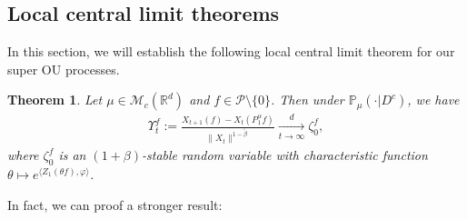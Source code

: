 \documentclass[12pt,a4paper]{amsart}
\theoremstyle{plain}
\newtheorem{thm}{Theorem}[section]
\theoremstyle{definition}
\numberwithin{equation}{section}
\begin{document}
\begin{comment}
  Step 5.
  We will show that $I_3(t) \xrightarrow[t\to \infty]{\widetilde {\mathbb P}_\mu \text{-} a.s.} 0$.
  In fact, we have
  \begin{align}
    & |I_3(t)|
      \leq \frac{\langle |P^\alpha_tf|,X_0\rangle}{(t\|X_t\|)^{\frac{1}{1+\beta}}}
      \leq \frac{\langle e^{\alpha t - \kappa_f b t}Qf,X_0\rangle}{(te^{\alpha t} H_t)^{\frac{1}{1+\beta}}} \\
    & = t^{-\frac{1}{1+\beta}} e^{\frac{\beta \alpha t}{1+\beta} - k_fbt} H_t^{-\frac{1}{1+\beta}} \langle Qf,X_0\rangle
      = t^{-\frac{1}{1+\beta}} H_t^{-\frac{1}{1+\beta}} \langle Qf,X_0\rangle
      \xrightarrow[t\to \infty]{\widetilde {\mathbb P}_\mu \text{-} a.s.} 0.
  \end{align}
  
	Finally, combining Steps 3--5, we complete the proof of Theorem \ref{thm: critical clt}.
\end{proof}
\end{comment}
\subsection{Local central limit theorems}
\label{sec:critical}
In this section, we will establish the following local central limit theorem for our super OU processes.
\begin{thm}
  \label{lem:PR:LC}
  Let $\mu \in \mathcal M_c(\mathbb R^d)$ and $f\in \mathcal{P}\setminus \{0\}$.
  Then under $\mathbb{P}_{\mu}(\cdot | D ^c)$, we have
  \begin{align}
    \label{eq:PR:LC:1}
    \Upsilon^f_t 
    := \frac{X_{t+1} (f) - X_t(P_1^\alpha f)}{\| X_t\|^{1-\tilde \beta}}
    \xrightarrow[t\to \infty]{d}\zeta^f_0, 
  \end{align}
  where $\zeta^f_0$ is an $(1+\beta)$-stable random variable with characteristic function $\theta\mapsto e^{\langle Z_1(\theta f), \varphi\rangle}$.
\end{thm}

In fact, we can proof a stronger result:
\end{document}
